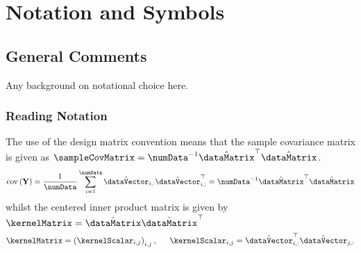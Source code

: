 \chapter*{Notation and Symbols}



\label{sec:notation}

\section*{General Comments}

Any background on notational choice here.
\subsection{Reading Notation}

The use of the design matrix convention means that the sample
covariance matrix is given as
$\sampleCovMatrix=\numData^{-1}\hat{\dataMatrix}^{\top}\hat{\dataMatrix}$.
\[
\mathrm{cov}\left(\mathbf{Y}\right)=\frac{1}{\numData}\sum_{i=1}^{\numData}\hat{\dataVector}_{i,:}\hat{\dataVector}_{i,:}^{\top}=\numData^{-1}\hat{\dataMatrix}^{\top}\hat{\dataMatrix}
\]
whilst the centered inner product matrix is given by
$\kernelMatrix=\hat{\dataMatrix}\hat{\dataMatrix}^{\top}$\[
\kernelMatrix=\left(\kernelScalar_{i,j}\right)_{i,j},\,\,\,\,\,\,\,\,\,\kernelScalar_{i,j}=\hat{\dataVector}_{i,:}^{\top}\hat{\dataVector}{}_{j,:}\]




